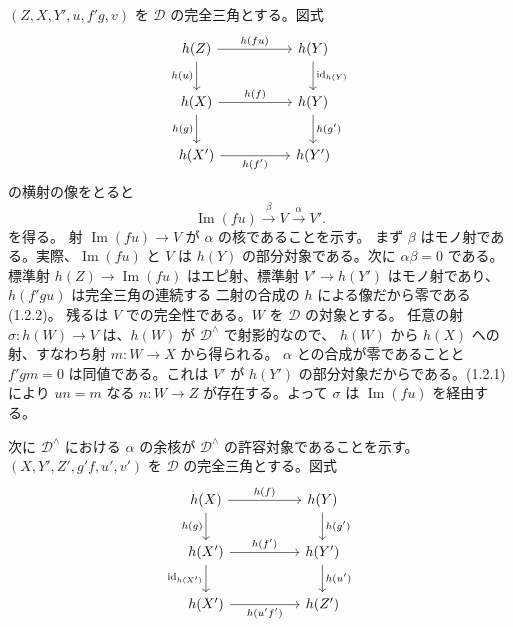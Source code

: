 \clearpage
{}%
\begingroup\small\setlength{\parskip}{0pt}\setlength{\emergencystretch}{1.5em}
$(Z,X,Y',u,f'g,v)$ を $\mathcal D$ の完全三角とする。図式
\[
\begin{tikzcd}[column sep=5em,row sep=2.1em]
h(Z)\arrow[r,"h(fu)"]\arrow[d,"h(u)"']&h(Y)\arrow[d,"\operatorname{id}_{h(Y)}"]\\
h(X)\arrow[r,"h(f)"]\arrow[d,"h(g)"']&h(Y)\arrow[d,"h(g')"]\\
h(X')\arrow[r,"h(f')"']&h(Y')
\end{tikzcd}
\]
の横射の像をとると
\[
\operatorname{Im}(fu)\xrightarrow{\beta}V\xrightarrow{\alpha}V'.
\tag{3.2.5.1}
\]
を得る。
射 $\operatorname{Im}(fu)\to V$ が $\alpha$ の核であることを示す。
まず $\beta$ はモノ射である。実際、$\operatorname{Im}(fu)$ と $V$ は
$h(Y)$ の部分対象である。次に $\alpha\beta=0$ である。標準射
$h(Z)\to\operatorname{Im}(fu)$ はエピ射、標準射
$V'\to h(Y')$ はモノ射であり、$h(f'gu)$ は完全三角の連続する
二射の合成の $h$ による像だから零である (1.2.2)。
残るは $V$ での完全性である。$W$ を $\mathcal D$ の対象とする。
任意の射 $\sigma\colon h(W)\to V$ は、$h(W)$ が $\mathcal D^\wedge$ で射影的なので、
$h(W)$ から $h(X)$ への射、すなわち射 $m\colon W\to X$ から得られる。
$\alpha$ との合成が零であることと $f'gm=0$ は同値である。これは
$V'$ が $h(Y')$ の部分対象だからである。(1.2.1) により
$un=m$ なる $n\colon W\to Z$ が存在する。よって $\sigma$ は
$\operatorname{Im}(fu)$ を経由する。

次に $\mathcal D^\wedge$ における $\alpha$ の余核が
$\mathcal D^\wedge$ の許容対象であることを示す。
$(X,Y',Z',g'f,u',v')$ を $\mathcal D$ の完全三角とする。図式
\[
\begin{tikzcd}[column sep=5em,row sep=2em]
h(X)\arrow[r,"h(f)"]\arrow[d,"h(g)"']&h(Y)\arrow[d,"h(g')"]\\
h(X')\arrow[r,"h(f')"]\arrow[d,"\operatorname{id}_{h(X')}"']&h(Y')\arrow[d,"h(u')"]\\
h(X')\arrow[r,"h(u'f')"']&h(Z')
\end{tikzcd}
\]
\endgroup
